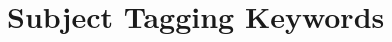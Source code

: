 \documentclass[12pt]{thesis}
\theoremstyle{plain}
\theoremstyle{definition}
\theoremstyle{remark}
\begin{document}
{%

\section{Subject Tagging Keywords}

}
\end{document}
